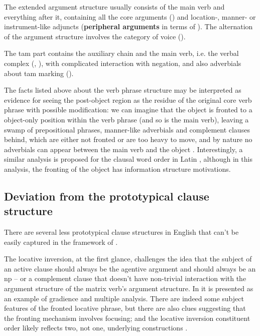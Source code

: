 \documentclass[UTF8, a4paper, oneside, scheme=plain, 12pt]{ctexbook}
\newcommand*{\citepage}[1]{p.~{#1}}
\newcommand*{\citepages}[1]{pp.~{#1}}
\newcommand*{\concept}[1]{\textbf{#1}}
\begin{document}
The extended argument structure usually consists of the main verb and everything after it,
containing all the core arguments ()
and location-, manner- or instrument-like adjuncts 
(\concept{peripheral arguments} in terms of \citet{dixon2009basic1}).
The alternation of the argument structure involves the category of voice 
().

The \acs{tam} part contains the auxiliary chain and the main verb, i.e. the verbal complex
(, ),
with complicated interaction with negation, 
and also adverbials about \acs{tam} marking 
(). 

The facts listed above about the verb phrase structure  
may be interpreted as evidence for seeing the post-object region 
as the residue of the original core verb phrase with possible modification: 
we can imagine that the object is fronted to a object-only position within the verb phrase 
(and so is the main verb), 
leaving a swamp of prepositional phrases, manner-like adverbials and complement clauses behind, 
which are either not fronted or are too heavy to move,
and by nature no adverbials can appear between the main verb and the object
\citep[\citepages{26-28}]{koizumi1995phrase}.
Interestingly, a similar analysis is proposed for the clausal word order in Latin 
\citep[\citepage{88}]{devine2006latin}, 
although in this analysis, the fronting of the object has information structure motivations.

\subsection{Deviation from the prototypical clause structure}

There are several less prototypical clause structures in English 
that can't be easily captured in the framework of .

The locative inversion, at the first glance, 
challenges the idea that the subject of an active clause should always be the agentive argument
and should always be an \acs{np} 
-- or a complement clause that doesn't have non-trivial interaction 
with the argument structure of the matrix verb's argument structure.
In \citet[\citepage{60}]{quirk1985} it is presented as an example of gradience and multiple analysis.
There are indeed some subject features of the fronted locative phrase, 
but there are also clues suggesting that the fronting mechanism involves focusing; 
and the locative inversion constituent order likely reflects 
two, not one, underlying constructions \citep{diercks2017}.
\end{document}
